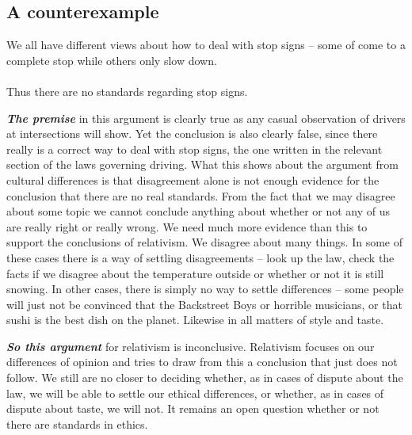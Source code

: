 \documentclass[12pt, openany]{book}
\begin{document}
\hypertarget{a-counterexample}{%
\subsection*{A counterexample}\label{a-counterexample}}


\begin{center}

\begin{argument}

We all have different views about how to deal with stop signs -- some of come to a complete stop while others only slow down.\\
~\\
Thus there are no standards regarding stop signs.

\end{argument}

\end{center}

\textbf{\emph{The premise}} in this argument is clearly true as any casual observation of drivers at intersections will show. Yet the conclusion is also clearly false, since there really is a correct way to deal with stop signs, the one written in the relevant section of the laws governing driving. What this shows about the argument from cultural differences is that disagreement alone is not enough evidence for the conclusion that there are no real standards. From the fact that we may disagree about some topic we cannot conclude anything about whether or not any of us are really right or really wrong. We need much more evidence than this to support the conclusions of relativism. We disagree about many things. In some of these cases there is a way of settling disagreements -- look up the law, check the facts if we disagree about the temperature outside or whether or not it is still snowing. In other cases, there is simply no way to settle differences -- some people will just not be convinced that the Backstreet Boys or horrible musicians, or that sushi is the best dish on the planet. Likewise in all matters of style and taste.

\textbf{\emph{So this argument}} for relativism is inconclusive. Relativism focuses on our differences of opinion and tries to draw from this a conclusion that just does not follow. We still are no closer to deciding whether, as in cases of dispute about the law, we will be able to settle our ethical differences, or whether, as in cases of dispute about taste, we will not. It remains an open question whether or not there are standards in ethics.
\end{document}
